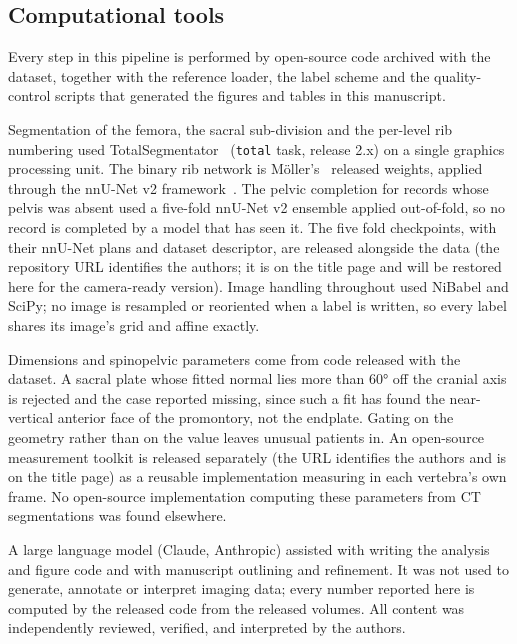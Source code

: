 \documentclass[aapm,mph,amsmath,amssymb,preprint,linenumbers]{revtex4-2}
\newif\ifreview \reviewtrue
\newcommand{\Toolkit}{\ifreview An open-source measurement toolkit\else OpenSpineToolkit, a unit-tested open-source package\fi}
\begin{document}
\subsection{Computational tools}\label{sec:tools}

Every step in this pipeline is performed by open-source code archived with the
dataset, together with the reference loader, the label scheme and the quality-control scripts
that generated the figures and tables in this manuscript.

Segmentation of the femora, the sacral sub-division and the
per-level rib numbering used TotalSegmentator~\cite{totalsegmentator} (\texttt{total} task,
release 2.x) on a single graphics processing unit. The binary rib network is
M\"oller's~\cite{moller2026} released weights, applied through the nnU-Net v2
framework~\cite{nnunet}. The pelvic completion for records whose pelvis was absent used a five-fold nnU-Net v2 ensemble
applied out-of-fold, so no record is completed by a model that has seen it. The five fold
checkpoints, with their nnU-Net plans and dataset descriptor, are released alongside the
data (\ifreview the repository URL identifies the authors; it is on the title page and will be
restored here for the camera-ready version\else\url{https://huggingface.co/OpenSpineConsortium/spinopelvic-seg-checkpoints}, trained with \url{https://github.com/Gregory-Schwing-MD-PhD/spinesurg-ct-nnunet} at commit 50b209f\fi). Image handling throughout used NiBabel and SciPy; no image is resampled or reoriented when a
label is written, so every label shares its image's grid and affine exactly.

Dimensions and spinopelvic parameters come from code released with the
dataset. A sacral plate whose fitted normal lies more than 60\si{\degree} off the cranial axis is
rejected and the case reported missing, since such a fit has found the near-vertical anterior
face of the promontory, not the endplate. Gating on the geometry rather than on the
value leaves unusual patients in. \Toolkit{} is released separately
(\ifreview the URL identifies the authors and is on the title page\else\url{https://github.com/OpenSpineConsortium/OpenSpineToolkit}\fi)
as a reusable implementation measuring in each vertebra's own frame. No open-source
implementation computing these parameters from CT segmentations was found elsewhere.

A large language model (Claude, Anthropic) assisted
with writing the analysis and figure code and with manuscript outlining and refinement. It was
not used to generate, annotate or interpret imaging data; every number reported here is computed by the released code from the
released volumes. All content was independently reviewed, verified, and interpreted by the authors.
\end{document}
